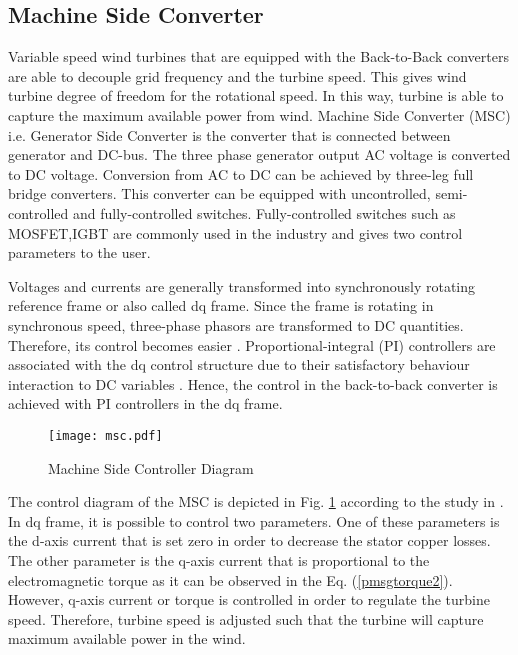 \subsection{Machine Side Converter}
Variable speed wind turbines that are equipped with the Back-to-Back converters are able to decouple grid frequency and the turbine speed. This gives wind turbine degree of freedom for the rotational speed. In this way, turbine is able to capture the maximum available power from wind. Machine Side Converter (MSC) i.e. Generator Side Converter is the converter that is connected between generator and DC-bus. The three phase generator output AC voltage is converted to DC voltage. Conversion from AC to DC can be achieved by three-leg full bridge converters. This converter can be equipped with uncontrolled, semi-controlled and fully-controlled switches. Fully-controlled switches such as MOSFET,IGBT are commonly used in the industry and gives two control parameters to the user. \par
Voltages and currents are generally transformed into synchronously rotating reference frame or also called dq frame. Since the frame is rotating in synchronous speed, three-phase phasors are transformed to DC quantities. Therefore, its control becomes easier \cite{Kazmierkowski2002}. Proportional-integral (PI) controllers are associated with the dq control structure due to their satisfactory behaviour interaction to DC variables \cite{Blaabjerg2006a}. Hence, the control in the back-to-back converter is achieved with PI controllers in the dq frame. \par
\begin{figure}[h!]
	\centering
	\texttt{[image: msc.pdf]}
	\caption{Machine Side Controller Diagram}
	\label{msc}
\end{figure}
The control diagram of the MSC is depicted in Fig. \ref{msc} according to the study in \cite{Chinchilla2006}. In dq frame, it is possible to control two parameters. One of these parameters is the d-axis current that is set zero in order to decrease the stator copper losses. The other parameter is the q-axis current that is proportional to the electromagnetic torque as it can be observed in the Eq. (\ref{pmsgtorque2}). However, q-axis current or torque is controlled in order to regulate the turbine speed. Therefore, turbine speed is adjusted such that the turbine will capture maximum available power in the wind. 
